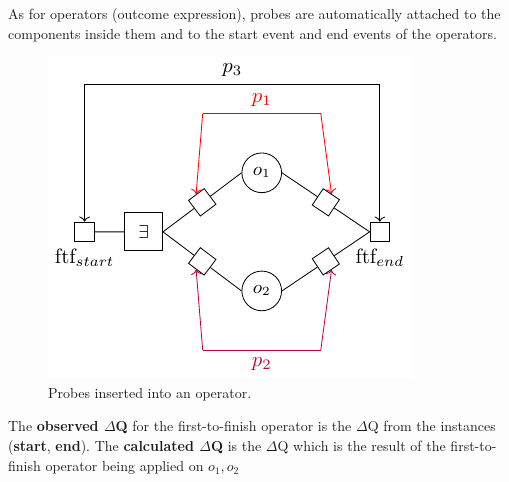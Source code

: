        As for operators (outcome expression), probes are automatically attached to the components inside them and to the start event and end events of the operators. 

       \begin{figure}[H]
           \begin{center}
                \includegraphics[scale = 1.3]{tikz/probe_2.pdf}
            \end{center}
            \label{fig:probes_op}
            \caption{Probes inserted into an operator.}
       \end{figure}
    
    The \textbf{observed $\Delta$Q} for the first-to-finish operator is the $\Delta$Q from the instances (\textbf{start}, \textbf{end}). The \textbf{calculated $\Delta$Q} is the $\Delta$Q which is the result of the first-to-finish operator being applied on $o_1, o_2$
        

